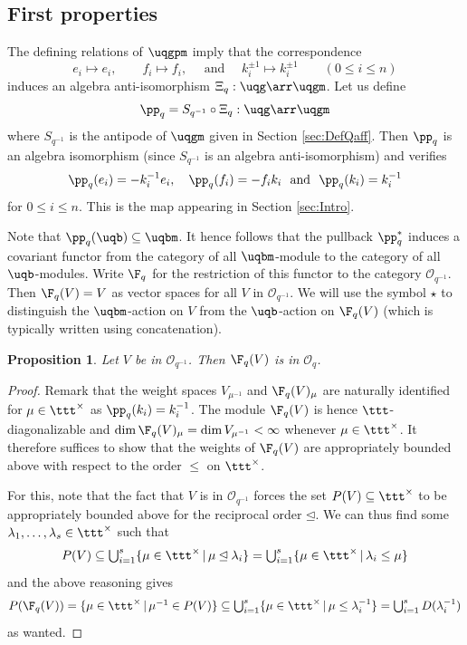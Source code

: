 \documentclass[11pt]{amsart}
\newtheorem{prop}[theorem]{Proposition}
\theoremstyle{definition}
\theoremstyle{remark}
\numberwithin{equation}{section}
\begin{document}
\subsection{First properties}\label{sec:Comon} The defining relations of $\uqgpm$ imply that the correspondence $$e_i\mapsto e_i, \qquad f_i\mapsto f_i, \quad \text{ and } \quad k_i^{\pm 1}\mapsto k_i^{\pm 1} \qquad (0\leq i\leq n)$$ induces an algebra anti-isomorphism $\Xi_q:\uqg\arr \uqgm$. %
Let us define $$\pp_q = S_{q^{-1}}\circ \Xi_q:\uqg\arr \uqgm$$
where $S_{q^{-1}}$ is the antipode of $\uqgm$ given in Section \ref{sec:DefQaff}. Then $\pp_q$ is an algebra isomorphism (since $S_{q^{-1}}$ is an algebra anti-isomorphism) and verifies
$$ \pp_q(e_i) = -k_i^{-1}e_i, \quad \pp_q(f_i) = -f_ik_i \ \text{ and } \ \pp_q(k_i)=k_i^{-1}$$
for $0\leq i\leq n$. This is the map appearing in Section \ref{sec:Intro}.\par
Note that $\pp_q(\uqb) \subseteq \uqbm$. It hence follows that the pullback $\pp_q^*$ induces a covariant functor from the category of all $\uqbm$-module to the category of all $\uqb$-modules. Write $\F_q$ for the restriction of this functor to the category $\mathcal{O}_{q^{-1}}$. Then $\F_q(V) = V$ as vector spaces for all $V$ in $\mathcal{O}_{q^{-1}}$. We will use the symbol $\star$ to distinguish the $\uqbm$-action on $V$ from the $\uqb$-action on $\F_q(V)$ (which is typically written using concatenation).
\begin{prop}\label{prop:FO} Let $V$ be in $\mathcal{O}_{q^{-1}}$. Then $\F_q(V)$ is in $\mathcal{O}_q$.
\end{prop}
\begin{proof} Remark that the weight spaces $V_{\mu^{-1}}$ and $\F_q(V)_{\mu}$ are naturally identified for $\mu\in \ttt^{\times}$ as $\pp_q(k_i) = k_i^{-1}$. The module $\F_q(V)$ is hence $\ttt$-diagonalizable and $\dim \F_q(V)_{\mu} = \dim V_{\mu^{-1}} < \infty$ whenever $\mu \in \ttt^{\times}$. It therefore suffices to show that the weights of $\F_q(V)$ are appropriately bounded above with respect to the order $\leq$ on $\ttt^{\times}$. \par For this, note that the fact that $V$ is in $\mathcal{O}_{q^{-1}}$ forces the set $P(V)\subseteq \ttt^{\times}$ to be appropriately bounded above for the reciprocal 
order $\unlhd$. We can thus find some $\lambda_1,\dots ,\lambda_s \in \ttt^{\times}$ such that $$\textstyle P(V)\subseteq \bigcup_{i=1}^s \{\mu\in \ttt^{\times}\,|\,\mu\unlhd \lambda_i\}=\bigcup_{i=1}^s\{\mu\in \ttt^{\times}\,|\, \lambda_i\leq \mu\}$$  and the above reasoning gives 
$$ \textstyle P(\F_q(V)) = \{\mu\in \ttt^{\times}\,|\, \mu^{-1}\in P(V)\} \subseteq \bigcup_{i=1}^s\{\mu \in \ttt^{\times}\,|\, \mu\leq \lambda_i^{-1}\}= \bigcup_{i=1}^s D(\lambda_i^{-1})$$
as wanted.
\end{proof}
\end{document}
